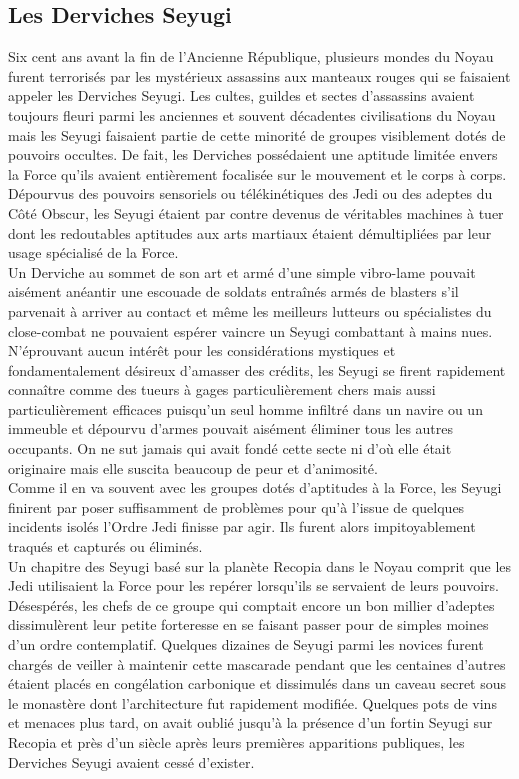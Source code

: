 \documentclass[twoside]{article}
\begin{document}
\subsection{Les Derviches Seyugi}
Six cent ans avant la fin de l'Ancienne République, plusieurs mondes du Noyau furent terrorisés par les mystérieux assassins aux manteaux rouges qui se faisaient appeler les Derviches Seyugi. Les cultes, guildes et sectes d'assassins avaient toujours fleuri parmi les anciennes et souvent décadentes civilisations du Noyau mais les Seyugi faisaient partie de cette minorité de groupes visiblement dotés de pouvoirs occultes. De fait, les Derviches possédaient une aptitude limitée envers la Force qu'ils avaient entièrement focalisée sur le mouvement et le corps à corps. Dépourvus des pouvoirs sensoriels ou télékinétiques des Jedi ou des adeptes du Côté Obscur, les Seyugi étaient par contre devenus de véritables machines à tuer dont les redoutables aptitudes aux arts martiaux étaient démultipliées par leur usage spécialisé de la Force.\\

Un Derviche au sommet de son art et armé d'une simple vibro-lame pouvait aisément anéantir une escouade de soldats entra\^{i}nés armés de blasters s'il parvenait à arriver au contact et même les meilleurs lutteurs ou spécialistes du close-combat ne pouvaient espérer vaincre un Seyugi combattant à mains nues.
N'éprouvant aucun intérêt pour les considérations mystiques et fondamentalement désireux d'amasser des crédits, les Seyugi se firent rapidement conna\^{i}tre comme des tueurs à gages particulièrement chers mais aussi particulièrement efficaces puisqu'un seul homme infiltré dans un navire ou un immeuble et dépourvu d'armes pouvait aisément éliminer tous les autres occupants. On ne sut jamais qui avait fondé cette secte ni d'où elle était originaire mais elle suscita beaucoup de peur et d'animosité.\\

Comme il en va souvent avec les groupes dotés d'aptitudes à la Force, les Seyugi finirent par poser suffisamment de problèmes pour qu'à l'issue de quelques incidents isolés l'Ordre Jedi finisse par agir. Ils furent alors impitoyablement traqués et capturés ou éliminés.\\

Un chapitre des Seyugi basé sur la planète Recopia dans le Noyau comprit que les Jedi utilisaient la Force pour les repérer lorsqu'ils se servaient de leurs pouvoirs. Désespérés, les chefs de ce groupe qui comptait encore un bon millier d'adeptes dissimulèrent leur petite forteresse en se faisant passer pour de simples moines d'un ordre contemplatif. Quelques dizaines de Seyugi parmi les novices furent chargés de veiller à maintenir cette mascarade pendant que les centaines d'autres étaient placés en congélation carbonique et dissimulés dans un caveau secret sous le monastère dont l'architecture fut rapidement modifiée.
Quelques pots de vins et menaces plus tard, on avait oublié jusqu'à la présence d'un fortin Seyugi sur Recopia et près d'un siècle après leurs premières apparitions publiques, les Derviches Seyugi avaient cessé d'exister.\\
\end{document}
